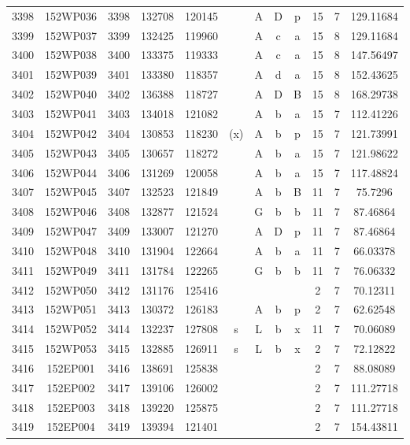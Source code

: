 \begin{tabular}{|*{12}{c|}}
3398 & 152WP036 & 3398 & 132708 & 120145 &  & A & D & p & 15 & 7 & 129.11684 \\ 
3399 & 152WP037 & 3399 & 132425 & 119960 &  & A & c & a & 15 & 8 & 129.11684 \\ 
3400 & 152WP038 & 3400 & 133375 & 119333 &  & A & c & a & 15 & 8 & 147.56497 \\ 
3401 & 152WP039 & 3401 & 133380 & 118357 &  & A & d & a & 15 & 8 & 152.43625 \\ 
3402 & 152WP040 & 3402 & 136388 & 118727 &  & A & D & B & 15 & 8 & 168.29738 \\ 
3403 & 152WP041 & 3403 & 134018 & 121082 &  & A & b & a & 15 & 7 & 112.41226 \\ 
3404 & 152WP042 & 3404 & 130853 & 118230 & (x) & A & b & p & 15 & 7 & 121.73991 \\ 
3405 & 152WP043 & 3405 & 130657 & 118272 &  & A & b & a & 15 & 7 & 121.98622 \\ 
3406 & 152WP044 & 3406 & 131269 & 120058 &  & A & b & a & 15 & 7 & 117.48824 \\ 
3407 & 152WP045 & 3407 & 132523 & 121849 &  & A & b & B & 11 & 7 & 75.7296 \\ 
3408 & 152WP046 & 3408 & 132877 & 121524 &  & G & b & b & 11 & 7 & 87.46864 \\ 
3409 & 152WP047 & 3409 & 133007 & 121270 &  & A & D & p & 11 & 7 & 87.46864 \\ 
3410 & 152WP048 & 3410 & 131904 & 122664 &  & A & b & a & 11 & 7 & 66.03378 \\ 
3411 & 152WP049 & 3411 & 131784 & 122265 &  & G & b & b & 11 & 7 & 76.06332 \\ 
3412 & 152WP050 & 3412 & 131176 & 125416 &  &  &  &  & 2 & 7 & 70.12311 \\ 
3413 & 152WP051 & 3413 & 130372 & 126183 &  & A & b & p & 2 & 7 & 62.62548 \\ 
3414 & 152WP052 & 3414 & 132237 & 127808 & s & L & b & x & 11 & 7 & 70.06089 \\ 
3415 & 152WP053 & 3415 & 132885 & 126911 & s & L & b & x & 2 & 7 & 72.12822 \\ 
3416 & 152EP001 & 3416 & 138691 & 125838 &  &  &  &  & 2 & 7 & 88.08089 \\ 
3417 & 152EP002 & 3417 & 139106 & 126002 &  &  &  &  & 2 & 7 & 111.27718 \\ 
3418 & 152EP003 & 3418 & 139220 & 125875 &  &  &  &  & 2 & 7 & 111.27718 \\ 
3419 & 152EP004 & 3419 & 139394 & 121401 &  &  &  &  & 2 & 7 & 154.43811 \\ 

\end{tabular}
